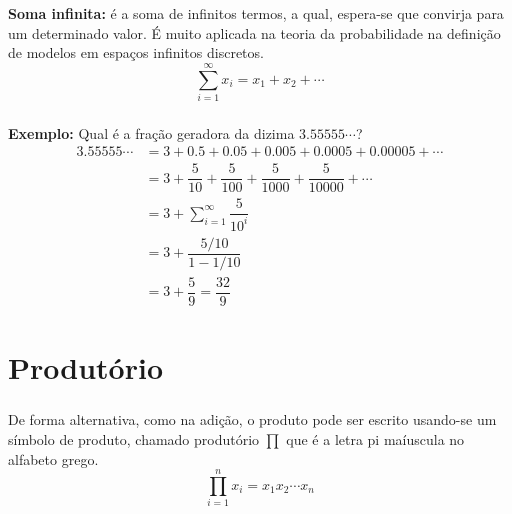 \documentclass[14pt,aspectratio=1610]{beamer}
\begin{document}
\begin{frame}{}
\frametitle{}
\begin{block}{}
\justifying
{\bf Soma infinita:} é a soma de infinitos termos, a qual, espera-se que convirja para um determinado
valor. É muito aplicada na teoria da probabilidade na definição de modelos em espaços infinitos discretos.
$${\displaystyle \sum_{i=1}^{\infty}x_{i}=x_{1}+x_{2}+\cdots}$$
\end{block}
\end{frame}

\begin{frame}{}
\frametitle{}
\begin{block}{}
\justifying
{\bf Exemplo:} Qual é a fração geradora da dizima $3.55555\cdots$?
\begin{align*}
3.55555\cdots &=3+0.5+0.05+0.005+0.0005+0.00005+\cdots\\
&=3+\dfrac{5}{10}+\dfrac{5}{100}+\dfrac{5}{1000}+\dfrac{5}{10000}+\cdots\\
&=3+{\displaystyle \sum_{i=1}^{\infty}\dfrac{5}{10^{i}}}\\
&=3+\dfrac{5/10}{1-1/10}\\
&=3+\dfrac{5}{9}=\dfrac{32}{9}
\end{align*}
\end{block}
\end{frame}

\section{Produtório}
\begin{frame}{}
\frametitle{}
\begin{block}{}
\justifying
De forma alternativa, como na adição, o produto pode ser escrito usando-se um símbolo de produto, chamado 
produtório $\prod$ que é a letra pi maíuscula no alfabeto grego.
$${\displaystyle \prod_{i=1}^{n}x_{i}=x_{1}x_{2}\cdots x_{n}}$$
\end{block}
\end{frame}

% 
\end{document}
